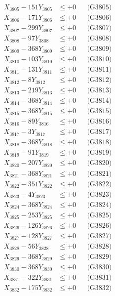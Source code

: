\documentclass[a4paper,10pt]{article}
\begin{document}
{\begin{align}
X_{3805} - 151Y_{3805} &\leq +0 && \text{(G3805)} \\
X_{3806} - 171Y_{3806} &\leq +0 && \text{(G3806)} \\
X_{3807} - 299Y_{3807} &\leq +0 && \text{(G3807)} \\
X_{3808} - 97Y_{3808} &\leq +0 && \text{(G3808)} \\
X_{3809} - 368Y_{3809} &\leq +0 && \text{(G3809)} \\
X_{3810} - 103Y_{3810} &\leq +0 && \text{(G3810)} \\
\allowbreak
X_{3811} - 131Y_{3811} &\leq +0 && \text{(G3811)} \\
X_{3812} - 8Y_{3812} &\leq +0 && \text{(G3812)} \\
X_{3813} - 219Y_{3813} &\leq +0 && \text{(G3813)} \\
X_{3814} - 368Y_{3814} &\leq +0 && \text{(G3814)} \\
X_{3815} - 368Y_{3815} &\leq +0 && \text{(G3815)} \\
X_{3816} - 89Y_{3816} &\leq +0 && \text{(G3816)} \\
X_{3817} - 3Y_{3817} &\leq +0 && \text{(G3817)} \\
X_{3818} - 368Y_{3818} &\leq +0 && \text{(G3818)} \\
X_{3819} - 91Y_{3819} &\leq +0 && \text{(G3819)} \\
X_{3820} - 207Y_{3820} &\leq +0 && \text{(G3820)} \\
\allowbreak
X_{3821} - 368Y_{3821} &\leq +0 && \text{(G3821)} \\
X_{3822} - 351Y_{3822} &\leq +0 && \text{(G3822)} \\
X_{3823} - 4Y_{3823} &\leq +0 && \text{(G3823)} \\
X_{3824} - 368Y_{3824} &\leq +0 && \text{(G3824)} \\
X_{3825} - 253Y_{3825} &\leq +0 && \text{(G3825)} \\
X_{3826} - 126Y_{3826} &\leq +0 && \text{(G3826)} \\
X_{3827} - 128Y_{3827} &\leq +0 && \text{(G3827)} \\
X_{3828} - 56Y_{3828} &\leq +0 && \text{(G3828)} \\
X_{3829} - 368Y_{3829} &\leq +0 && \text{(G3829)} \\
X_{3830} - 368Y_{3830} &\leq +0 && \text{(G3830)} \\
\allowbreak
X_{3831} - 322Y_{3831} &\leq +0 && \text{(G3831)} \\
X_{3832} - 175Y_{3832} &\leq +0 && \text{(G3832)} \\

\end{align}}
\end{document}
